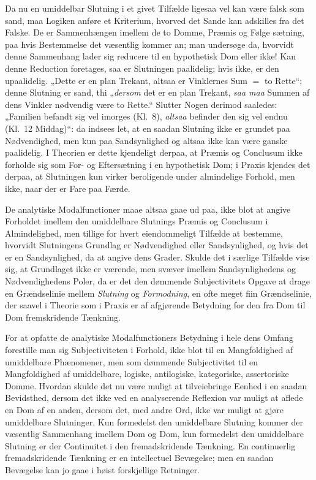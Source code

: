 \documentclass[12pt]{book}
\newcommand{\opage}[1]{\marginnote{\footnotesize\textit{[#1]}}}
\begin{document}
Da nu en umiddelbar Slutning i et givet Tilfælde ligesaa vel kan være falsk som sand, maa Logiken anføre et Kriterium, hvorved det Sande kan adskilles fra det Falske. De er Sammenhængen imellem de to Domme, Præmis og Følge%
\opage{306}sætning, paa hvis Bestemmelse det væsentlig kommer an; man undersøge da, hvorvidt denne Sammenhang lader sig reducere til en hypothetisk Dom eller ikke! Kan denne Reduction foretages, saa er Slutningen paalidelig; hvis ikke, er den upaalidelig. „Dette er en plan Trekant, altsaa er Vinklernes Sum $=$ to Rette“; denne Slutning er sand, thi „\emph{dersom} det er en plan Trekant, \emph{saa maa} Summen af dens Vinkler nødvendig være to Rette.“ Slutter Nogen derimod saaledes: „Familien befandt sig vel imorges (Kl.~8), \emph{altsaa} befinder den sig vel endnu (Kl.~12 Middag)“: da indsees let, at en saadan Slutning ikke er grundet paa Nødvendighed, men kun paa Sandsynlighed og altsaa ikke kan være ganske paalidelig. I Theorien er dette kjendeligt derpaa, at Præmis og Conclusum ikke forholde sig som For- og Eftersætning i en hypothetisk Dom; i Praxis kjendes det derpaa, at Slutningen kun virker beroligende under almindelige Forhold, men ikke, naar der er Fare paa Færde.

De analytiske Modalfunctioner maae altsaa gaae ud paa, ikke blot at angive Forholdet imellem den umiddelbare Slutnings Præmis og Conclusum i Almindelighed, men tillige for hvert eiendommeligt Tilfælde at bestemme, hvorvidt Slutningens Grundlag er Nødvendighed eller Sandsynlighed, og hvis det er en Sandsynlighed, da at angive dens Grader. Skulde det i særlige Tilfælde vise sig, at Grundlaget ikke er værende, men svæver imellem Sandsynlighedens og Nødvendighedens Poler, da er det den dømmende Subjectivitets Opgave at drage en Grændselinie mellem \emph{Slutning} og \emph{Formodning}, en ofte meget fiin Grændselinie, der saavel i Theorie som i Praxis er af afgjørende Betydning for den fra Dom til Dom fremskridende Tænkning.

For at opfatte de analytiske Modalfunctioners Betydning i hele dens Omfang forestille man sig Subjectiviteten i Forhold, ikke blot til en Mangfoldighed af umiddelbare Phænomener, men som dømmende Subjectivitet til en Mangfoldighed
\opage{307}af umiddelbare, logiske, antilogiske, kategoriske, assertoriske Domme. Hvordan skulde det nu være muligt at tilveiebringe Eenhed i en saadan Bevidsthed, dersom det ikke ved en analyserende Reflexion var muligt at aflede en Dom af en anden, dersom det, med andre Ord, ikke var muligt at gjøre umiddelbare Slutninger. Kun formedelst den umiddelbare Slutning kommer der væsentlig Sammenhang imellem Dom og Dom, kun formedelst den umiddelbare Slutning er der Continuitet i den fremadskridende Tænkning. En continuerlig fremadskridende Tænkning er en intellectuel Bevægelse; men en saadan Bevægelse kan jo gaae i høist forskjellige Retninger.
\end{document}
